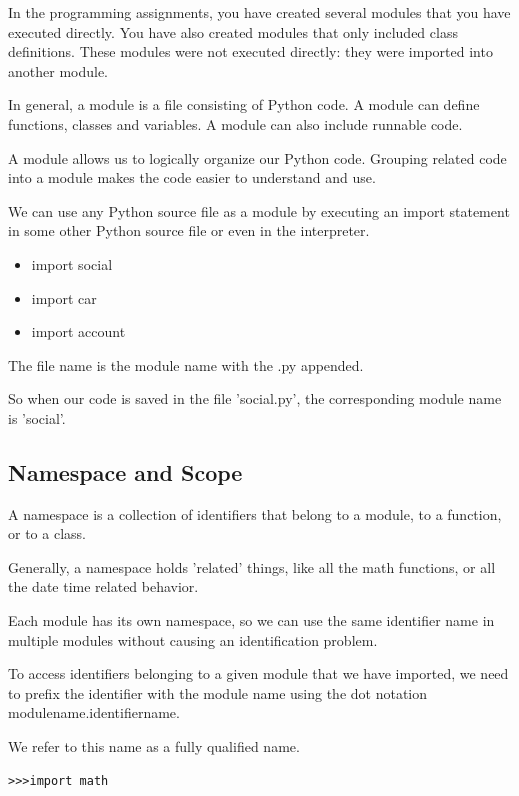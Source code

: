 \documentclass{article}
\begin{document}
In the programming assignments, you have created several modules that you have executed directly.  You have also created modules that only included class definitions.  These modules were not executed directly:  they were imported into another module.

In general, a module is a file consisting of Python code. A module can define functions, classes and variables. A module can also include runnable code.

A module allows us to logically organize our Python code. Grouping related code into a module makes the code easier to understand and use.

We can use any Python source file as a module by executing an import statement in some other Python source file or even in the interpreter.

\begin{itemize}
\item import social

\item import car

\item import account
\end{itemize}

The file name is the module name with the  .py appended.

So when our code is saved in the file  'social.py', the corresponding module name is 'social'.

\subsection{Namespace and Scope}
A namespace is a collection of identifiers that belong to a module, to a function, or to a class.

Generally, a namespace holds 'related' things, like all the math functions, or all the date time related behavior.

Each module has its own namespace, so we can use the same identifier name in multiple modules without causing an identification problem.

To access identifiers belonging to a given module that we have imported, we need to prefix the identifier with the module name using the dot notation modulename.identifiername.

We refer to this name as a fully qualified name.

\begin{lstlisting}
>>>import math
\end{lstlisting}
\end{document}
